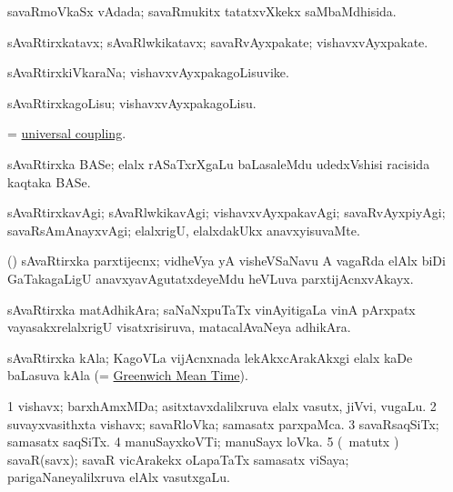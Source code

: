 \bentry
{} 
\gl{\gu}
\expl{}
\bmng
savaRmoVkaSx vAdada; savaRmukitx tatatxvXkekx saMbaMdhisida. 
\emng
\eentry

\bentry
{} 
\gl{\nA}
\expl{}
\bmng
sAvaRtirxkatavx; sAvaRlwkikatavx; savaRvAyxpakate; vishavxvAyxpakate. 
\emng
\eentry

\bentry
{} 
\gl{\nA}
\expl{}
\bmng
sAvaRtirxkiVkaraNa; vishavxvAyxpakagoLisuvike. 
\emng
\eentry

\bentry
{} 
\gl{\sakirx}
\expl{}
\bmng
sAvaRtirxkagoLisu; vishavxvAyxpakagoLisu. 
\emng
\eentry

\bentry
{}
\gl{\nA}
\expl{}
\bmng
= \hyperlink{universal coupling}{universal coupling}. 
\emng
\eentry

\bentry
{}
\gl{\nA}
\expl{}
\bmng
sAvaRtirxka BASe; elalx rASaTxrXgaLu baLasaleMdu udedxVshisi racisida kaqtaka BASe. 
\emng
\eentry

\bentry
{} 
\gl{\kirxvi}
\expl{}
\bmng
sAvaRtirxkavAgi; sAvaRlwkikavAgi; vishavxvAyxpakavAgi; savaRvAyxpiyAgi; savaRsAmAnayxvAgi; elalxrigU, elalxdakUkx anavxyisuvaMte. 
\emng
\eentry

\bentry
{}
\gl{\nA}
\expl{}
\bmng
(\takaR) sAvaRtirxka parxtijecnx; vidheVya yA visheVSaNavu A vagaRda elAlx biDi GaTakagaLigU anavxyavAgutatxdeyeMdu heVLuva parxtijAcnxvAkayx. 
\emng
\eentry

\bentry
{}
\gl{\nA}
\expl{}
\bmng
sAvaRtirxka matAdhikAra; saNaNxpuTaTx vinAyitigaLa vinA pArxpatx vayasakxrelalxrigU visatxrisiruva, matacalAvaNeya adhikAra. 
\emng
\eentry

\bentry
{}
\gl{\nA}
\expl{}
\bmng
sAvaRtirxka kAla; KagoVLa vijAcnxnada lekAkxcArakAkxgi elalx kaDe baLasuva kAla (= \hyperref{kandict_g.pdf}{G}{Greenwich mean time}{Greenwich Mean Time}). 
\emng
\eentry

\bentry
{} 
\gl{\nA}
\expl{}
\bmng
\bnum
\num{1} vishavx; barxhAmxMDa; asitxtavxdalilxruva elalx vasutx, jiVvi, \mo vugaLu. 
\num{2} suvayxvasithxta vishavx; savaRloVka; samasatx parxpaMca. 
\num{3} savaRsaqSiTx; samasatx saqSiTx. 
\num{4} manuSayxkoVTi; manuSayx loVka. 
\num{5} (\saMshA\ matutx \takaR) savaR(savx); savaR vicArakekx oLapaTaTx samasatx viSaya; parigaNaneyalilxruva elAlx vasutxgaLu. 
\enum
\emng

